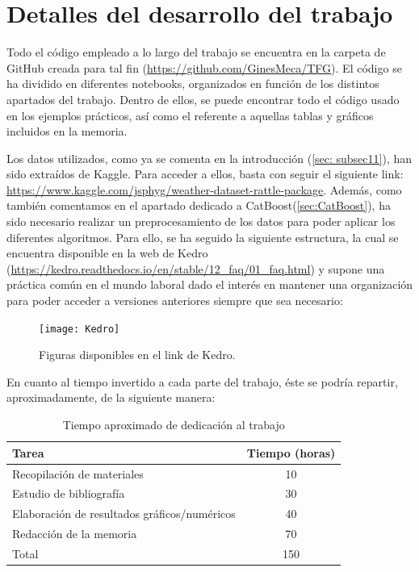 \documentclass[12pt,twoside]{article}
\begin{document}
\newpage
\appendix
\section{Detalles del desarrollo del trabajo} \label{Anexo}

Todo el código empleado a lo largo del trabajo se encuentra en la carpeta de GitHub creada para tal fin (\url{https://github.com/GinesMeca/TFG}). El código se ha dividido en diferentes notebooks, organizados en función de los distintos apartados del trabajo. Dentro de ellos, se puede encontrar todo el código usado en los ejemplos prácticos, así como el referente a aquellas tablas y gráficos incluidos en la memoria.

Los datos utilizados, como ya se comenta en la introducción (\ref{sec: subsec11}), han sido extraídos de Kaggle. Para acceder a ellos, basta con seguir el siguiente link: \url{https://www.kaggle.com/jsphyg/weather-dataset-rattle-package}. Además, como también comentamos en el apartado dedicado a CatBoost(\ref{sec:CatBoost}), ha sido necesario realizar un preprocesamiento de los datos para poder aplicar los diferentes algoritmos. Para ello, se ha seguido la siguiente estructura, la cual se encuentra disponible en la web de Kedro (\url{https://kedro.readthedocs.io/en/stable/12_faq/01_faq.html}) y supone una práctica común en el mundo laboral dado el interés en mantener una organización para poder acceder a versiones anteriores siempre que sea necesario:
\begin{figure}[h]
\centering
\texttt{[image: Kedro]}
\caption{Figuras disponibles en el link de Kedro.}
\end{figure}

\newpage
En cuanto al tiempo invertido a cada parte del trabajo, éste se podría repartir, aproximadamente, de la siguiente manera:
\begin{table}[ht] 
\centering
\begin{tabular}{lc} 
  \hline
 Tarea & Tiempo (horas) \\ 
  \hline
Recopilación de materiales &   10 \\ 
Estudio de bibliografía &   30\\ 
Elaboración de resultados gráficos/numéricos &  40 \\ 
Redacción de la memoria &  70 \\
 \hline
Total & 150\\
\hline
\end{tabular}
\caption{Tiempo aproximado de dedicación al trabajo} \label{tab{02}}
\end{table}
\end{document}
